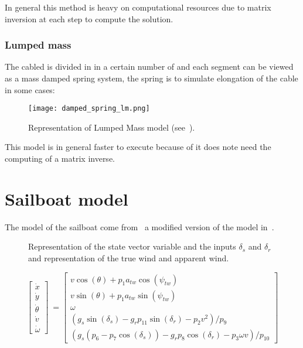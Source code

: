 In general this method is heavy on computational resources due to matrix inversion at each step to compute the solution.
 
 
\subsubsection*{Lumped mass}
 
The cabled is divided in in a certain number of and each segment can be viewed as a mass damped spring system, 
the spring is to simulate elongation of the cable in some cases:

\begin{figure}[H]
\centering
    \texttt{[image: damped\_spring\_lm.png]}
    \caption{Representation of Lumped Mass model (see~\cite{masciola2014extending}).}
    \label{fig:lm_damped}
\end{figure}

This model is in general faster to execute because of it does note need the computing of a matrix inverse.
 
\section{Sailboat model}

The model of the sailboat come from~\cite{Melin2016} a modified version of the model in~\cite{LeBars2013}.



\begin{figure}[H]
\centering
{} %
{

}
    \caption{Representation of the state vector variable and the inputs $\delta_s$ and $\delta_r$ and representation of the true wind and apparent wind.}
    \label{fig:drawing_boat_ink}
\end{figure}


\begin{equation}
\begin{bmatrix}
\dot{x}\\
\dot{y}\\
\dot{\theta}\\
\dot{v}\\
\dot{\omega}
\end{bmatrix}\  = \begin{bmatrix}
v \cos(\theta)+p_1 a_{tw} \cos(\psi_{tw})\\
v \sin(\theta)+p_1 a_{tw} \sin(\psi_{tw})\\
\omega\\
(g_s \sin(\delta_s)-g_r p_{11} \sin(\delta_r) - p_2 v^2)/p_9\\
(g_s(p_6-p_7\cos(\delta_s))-g_r p_8 \cos(\delta_r)-p_3 \omega v)/p_{10}
\end{bmatrix}
\end{equation}


